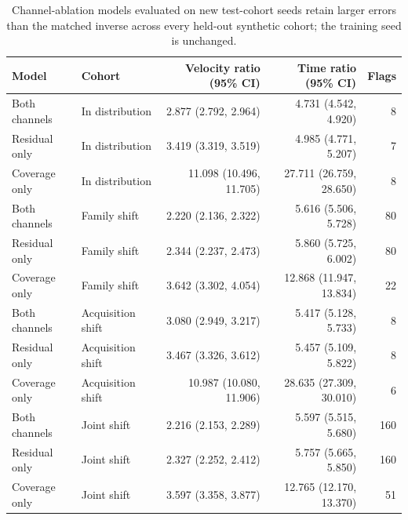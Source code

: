 \begin{table}[htbp]
\centering
\scriptsize
\caption{Channel-ablation models evaluated on new test-cohort seeds retain larger errors than the matched inverse across every held-out synthetic cohort; the training seed is unchanged.}
\label{tab:ablation}
\begin{tabular}{llrrr}
\toprule
Model & Cohort & Velocity ratio (95\% CI) & Time ratio (95\% CI) & Flags \\
\midrule
Both channels & In distribution & 2.877 (2.792, 2.964) & 4.731 (4.542, 4.920) & 8 \\
Residual only & In distribution & 3.419 (3.319, 3.519) & 4.985 (4.771, 5.207) & 7 \\
Coverage only & In distribution & 11.098 (10.496, 11.705) & 27.711 (26.759, 28.650) & 8 \\
Both channels & Family shift & 2.220 (2.136, 2.322) & 5.616 (5.506, 5.728) & 80 \\
Residual only & Family shift & 2.344 (2.237, 2.473) & 5.860 (5.725, 6.002) & 80 \\
Coverage only & Family shift & 3.642 (3.302, 4.054) & 12.868 (11.947, 13.834) & 22 \\
Both channels & Acquisition shift & 3.080 (2.949, 3.217) & 5.417 (5.128, 5.733) & 8 \\
Residual only & Acquisition shift & 3.467 (3.326, 3.612) & 5.457 (5.109, 5.822) & 8 \\
Coverage only & Acquisition shift & 10.987 (10.080, 11.906) & 28.635 (27.309, 30.010) & 6 \\
Both channels & Joint shift & 2.216 (2.153, 2.289) & 5.597 (5.515, 5.680) & 160 \\
Residual only & Joint shift & 2.327 (2.252, 2.412) & 5.757 (5.665, 5.850) & 160 \\
Coverage only & Joint shift & 3.597 (3.358, 3.877) & 12.765 (12.170, 13.370) & 51 \\
\bottomrule
\end{tabular}
\end{table}

